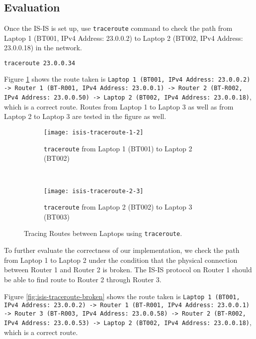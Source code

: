 \subsection{Evaluation}

Once the IS-IS is set up, use \texttt{traceroute} command to check the path from Laptop 1 (BT001, IPv4 Address: 23.0.0.2) to Laptop 2 (BT002, IPv4 Address: 23.0.0.18) in the network.

\begin{lstlisting}[language=sh]
traceroute 23.0.0.34
\end{lstlisting}

Figure \ref{fig:isis-traceroute} shows the route taken is 
\texttt{Laptop 1 (BT001, IPv4 Address: 23.0.0.2)
-> Router 1 (BT-R001, IPv4 Address: 23.0.0.1) 
-> Router 2 (BT-R002, IPv4 Address: 23.0.0.50)
-> Laptop 2 (BT002, IPv4 Address: 23.0.0.18)}, which is a correct route.
Routes from Laptop 1 to Laptop 3 as well as from Laptop 2 to Laptop 3 are tested in the figure as well.

\begin{figure}[ht!]
    \centering
    \begin{subfigure}[b]{\textwidth}
        \centering
        \texttt{[image: isis-traceroute-1-2]}
        \caption{\texttt{traceroute} from Laptop 1 (BT001) to Laptop 2 (BT002)}
    \end{subfigure}
    ~
    \begin{subfigure}[b]{\textwidth}
        \centering
        \texttt{[image: isis-traceroute-2-3]}
        \caption{\texttt{traceroute} from Laptop 2 (BT002) to Laptop 3 (BT003)}
    \end{subfigure}
    \caption{Tracing Routes between Laptops using \texttt{traceroute}.}
    \label{fig:isis-traceroute}
\end{figure}

To further evaluate the correctness of our implementation, we check the path from Laptop 1 to Laptop 2 under the condition that the physical connection between Router 1 and Router 2 is broken. The IS-IS protocol on Router 1 should be able to find route to Router 2 through Router 3.

Figure \ref{fig:isis-traceroute-broken} shows the route taken is 
\texttt{Laptop 1 (BT001, IPv4 Address: 23.0.0.2)
-> Router 1 (BT-R001, IPv4 Address: 23.0.0.1) 
-> Router 3 (BT-R003, IPv4 Address: 23.0.0.58) 
-> Router 2 (BT-R002, IPv4 Address: 23.0.0.53)
-> Laptop 2 (BT002, IPv4 Address: 23.0.0.18)}, which is a correct route.


